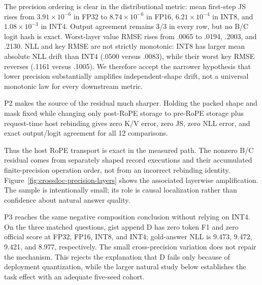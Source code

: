 \documentclass[11pt]{article}
\begin{document}
\begin{table}[ht]
\centering
\caption{Controlled B/C precision qualification on Qwen3-0.6B (three matched
questions per row). K/V are retained at the runtime activation dtype.}
\label{tab:crossdoc-precision}
\small
\resizebox{\linewidth}{!}{}
\end{table}

The precision ordering is clear in the distributional metric: mean first-step
JS rises from $3.91\times10^{-6}$ in FP32 to $8.74\times10^{-6}$ in FP16,
$6.21\times10^{-4}$ in INT8, and $1.08\times10^{-3}$ in INT4. Output agreement
remains 3/3 in every row, but no B/C logit hash is exact. Worst-layer value
RMSE rises from .0065 to .0194, .2003, and .2130. NLL and key RMSE are not
strictly monotonic: INT8 has larger mean absolute NLL drift than INT4 (.0500
versus .0083), while their worst key RMSE reverses (.1161 versus .1005). We
therefore accept the narrower hypothesis that lower precision substantially
amplifies independent-shape drift, not a universal monotonic law for every
downstream metric.

P2 makes the source of the residual much sharper. Holding the packed shape and
mask fixed while changing only post-RoPE storage to pre-RoPE storage plus
request-time host rebinding gives zero K/V error, zero JS, zero NLL error, and
exact output/logit agreement for all 12 comparisons.

\begin{table}[ht]
\centering
\caption{P2 shape-matched storage/rebinding control. The same packed host
execution is used on both sides; only pre-RoPE persistence and rebinding differ.}
\label{tab:crossdoc-shape-control}
\small

\end{table}

Thus the host RoPE transport is exact in the measured path. The nonzero B/C
residual comes from separately shaped record executions and their accumulated
finite-precision operation order, not from an incorrect rebinding identity.
Figure~\ref{fig:crossdoc-precision-layers} shows the associated layerwise
amplification. The sample is intentionally small; its role is causal
localization rather than confidence about natural answer quality.

P3 reaches the same negative composition conclusion without relying on INT4.
On the three matched questions, gist append D has zero token F1 and zero
official score at FP32, FP16, INT8, and INT4; gold-answer NLL is 9.473, 9.472,
9.421, and 8.977, respectively. The small cross-precision variation does not
repair the mechanism. This rejects the explanation that D fails only because
of deployment quantization, while the larger natural study below establishes
the task effect with an adequate five-seed cohort.
\end{document}
